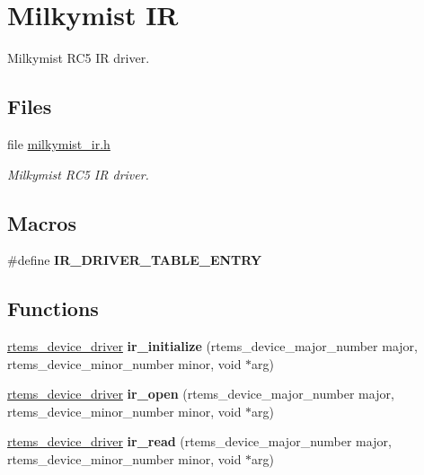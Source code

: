 \hypertarget{group__lm32__milkymist__ir}{}\section{Milkymist IR}
\label{group__lm32__milkymist__ir}


Milkymist R\+C5 IR driver.  


\subsection*{Files}
\begin{DoxyCompactItemize}
\item 
file \mbox{\hyperlink{milkymist__ir_8h}{milkymist\+\_\+ir.\+h}}
\begin{DoxyCompactList}\small\item\em Milkymist R\+C5 IR driver. \end{DoxyCompactList}\end{DoxyCompactItemize}
\subsection*{Macros}
\begin{DoxyCompactItemize}
\item 
\#define {\bfseries I\+R\+\_\+\+D\+R\+I\+V\+E\+R\+\_\+\+T\+A\+B\+L\+E\+\_\+\+E\+N\+T\+RY}
\end{DoxyCompactItemize}
\subsection*{Functions}
\begin{DoxyCompactItemize}
\item 
\mbox{\label{group__lm32__milkymist__ir_ga488c71b793cae3c3ad364445a204ded3}} 
\mbox{\hyperlink{group__ClassicStatus_ga545d41846817eaba6143d52ee4d9e9fe}{rtems\+\_\+device\+\_\+driver}} {\bfseries ir\+\_\+initialize} (rtems\+\_\+device\+\_\+major\+\_\+number major, rtems\+\_\+device\+\_\+minor\+\_\+number minor, void $\ast$arg)
\item 
\mbox{\label{group__lm32__milkymist__ir_ga22b13159305001c6098d95463a775d63}} 
\mbox{\hyperlink{group__ClassicStatus_ga545d41846817eaba6143d52ee4d9e9fe}{rtems\+\_\+device\+\_\+driver}} {\bfseries ir\+\_\+open} (rtems\+\_\+device\+\_\+major\+\_\+number major, rtems\+\_\+device\+\_\+minor\+\_\+number minor, void $\ast$arg)
\item 
\mbox{\label{group__lm32__milkymist__ir_ga529f0bf42aeb51c22649157d609b8e99}} 
\mbox{\hyperlink{group__ClassicStatus_ga545d41846817eaba6143d52ee4d9e9fe}{rtems\+\_\+device\+\_\+driver}} {\bfseries ir\+\_\+read} (rtems\+\_\+device\+\_\+major\+\_\+number major, rtems\+\_\+device\+\_\+minor\+\_\+number minor, void $\ast$arg)
\end{DoxyCompactItemize}


